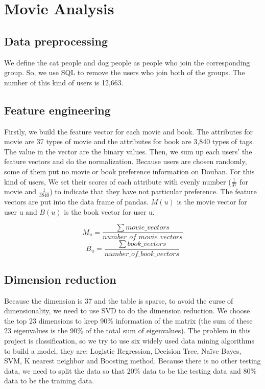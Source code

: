\documentclass[12pt]{article}
\begin{document}

\section{Movie Analysis}


\subsection{Data preprocessing}

We define the cat people and dog people as people who join the corresponding group. So, we use SQL to remove the users who join both of the groups. The number of this kind of users is 12,663.

\subsection{Feature engineering}

Firstly, we build the feature vector for each movie and book. The attributes for movie are 37 types of movie and the attributes for book are 3,840 types of tags. The value in the vector are the binary values. Then, we sum up each users' the feature vectors and do the normalization. Because users are chosen randomly, some of them put no movie or book preference information on Douban. For this kind of users, We set their scores of each attribute with evenly number ($\frac{1}{37}$ for movie and $\frac{1}{3840}$) to indicate that they have not particular preference. The feature vectors are put into the data frame of pandas. $M(u)$ is the movie vector for user u and $B(u)$ is the book vector for user u.

$$M_u = \frac{\sum movie\_vectors}{number\_of\_movie\_vectors}$$
$$B_u = \frac{\sum book\_vectors}{number\_of\_book\_vectors}$$

\subsection{Dimension reduction}
Because the dimension is 37 and the table is sparse, to avoid the curse of dimensionality, we need to use SVD to do the dimension reduction. We choose the top 23 dimensions to keep 90\% information of the matrix (the sum of these 23 eigenvalues is the 90\% of the total sum of eigenvalues). The problem in this project is classification, so we try to use six widely used data mining algorithms to build a model, they are: Logistic Regression, Decision Tree, Naïve Bayes, SVM, K nearest neighbor and Boosting method. Because there is no other testing data, we need to split the data so that 20\% data to be the testing data and 80\% data to be the training data.
\end{document}
